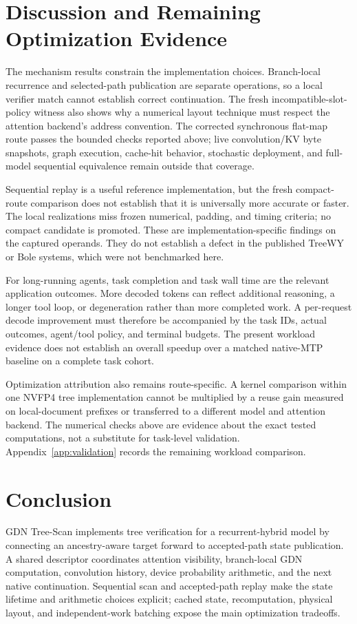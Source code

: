 \documentclass[conference]{IEEEtran}
\newcommand{\sys}{GDN Tree-Scan}
\begin{document}
\section{Discussion and Remaining Optimization Evidence}
\label{sec:planned}
The mechanism results constrain the implementation choices. Branch-local recurrence and selected-path publication are separate operations, so a local verifier match cannot establish correct continuation. The fresh incompatible-slot-policy witness also shows why a numerical layout technique must respect the attention backend's address convention. The corrected synchronous flat-map route passes the bounded checks reported above; live convolution/KV byte snapshots, graph execution, cache-hit behavior, stochastic deployment, and full-model sequential equivalence remain outside that coverage.

Sequential replay is a useful reference implementation, but the fresh compact-route comparison does not establish that it is universally more accurate or faster. The local realizations miss frozen numerical, padding, and timing criteria; no compact candidate is promoted. These are implementation-specific findings on the captured operands. They do not establish a defect in the published TreeWY or Bole systems, which were not benchmarked here.

For long-running agents, task completion and task wall time are the relevant application outcomes. More decoded tokens can reflect additional reasoning, a longer tool loop, or degeneration rather than more completed work. A per-request decode improvement must therefore be accompanied by the task IDs, actual outcomes, agent/tool policy, and terminal budgets. The present workload evidence does not establish an overall speedup over a matched native-MTP baseline on a complete task cohort.

Optimization attribution also remains route-specific. A kernel comparison within one NVFP4 tree implementation cannot be multiplied by a reuse gain measured on local-document prefixes or transferred to a different model and attention backend. The numerical checks above are evidence about the exact tested computations, not a substitute for task-level validation. Appendix~\ref{app:validation} records the remaining workload comparison.

\section{Conclusion}
\sys{} implements tree verification for a recurrent-hybrid model by connecting an ancestry-aware target forward to accepted-path state publication. A shared descriptor coordinates attention visibility, branch-local GDN computation, convolution history, device probability arithmetic, and the next native continuation. Sequential scan and accepted-path replay make the state lifetime and arithmetic choices explicit; cached state, recomputation, physical layout, and independent-work batching expose the main optimization tradeoffs.
\end{document}
